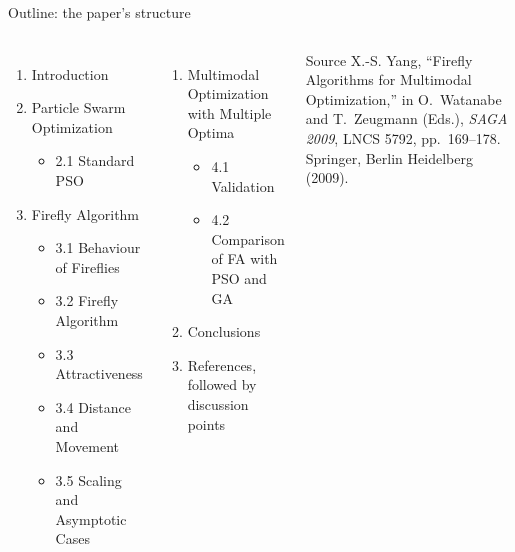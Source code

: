 \documentclass[aspectratio=169,11pt]{beamer}
\newcommand{\hdr}[1]{\gdef\curhdr{#1}}
\gdef\curhdr{}
\begin{document}
\hdr{Outline}
\begin{frame}[t]{Outline: the paper's structure}
\begin{columns}[T]
\begin{enumerate}\setlength{\itemsep}{0.5em}
  \item[\textbf{1}] Introduction
  \item[\textbf{2}] Particle Swarm Optimization
    \begin{itemize}\item[] 2.1 Standard PSO\end{itemize}
  \item[\textbf{3}] Firefly Algorithm
    \begin{itemize}\item[] 3.1 Behaviour of Fireflies
      \item[] 3.2 Firefly Algorithm
      \item[] 3.3 Attractiveness
      \item[] 3.4 Distance and Movement
      \item[] 3.5 Scaling and Asymptotic Cases\end{itemize}
\end{enumerate}
\begin{enumerate}\setlength{\itemsep}{0.5em}
  \item[\textbf{4}] Multimodal Optimization with Multiple Optima
    \begin{itemize}\item[] 4.1 Validation
      \item[] 4.2 Comparison of FA with PSO and GA\end{itemize}
  \item[\textbf{5}] Conclusions
  \item[] References, followed by discussion points
\end{enumerate}
\begin{block}{Source}\small
X.-S. Yang, ``Firefly Algorithms for Multimodal Optimization,'' in O.\ Watanabe and T.\ Zeugmann (Eds.), \emph{SAGA 2009}, LNCS 5792, pp.\ 169--178. Springer, Berlin Heidelberg (2009).
\end{block}
\end{columns}
\end{frame}
\end{document}
